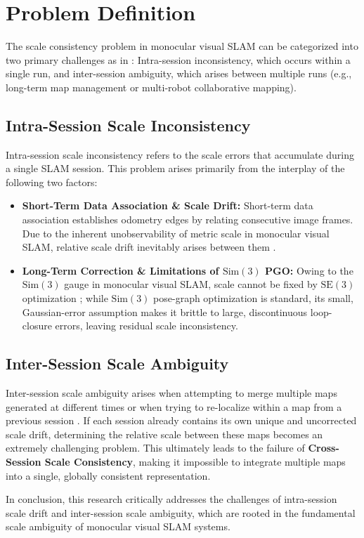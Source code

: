 % 

% 

\section{Problem Definition}
\label{sec:prob_def}

% 

% 

% 

% 

The scale consistency problem in monocular visual \ac{SLAM} can be categorized into two primary challenges as in : Intra-session inconsistency, which occurs within a single run, and inter-session ambiguity, which arises between multiple runs (e.g., long-term map management or multi-robot collaborative mapping). 

\subsection{Intra-Session Scale Inconsistency}
Intra-session scale inconsistency refers to the scale errors that accumulate during a single \ac{SLAM} session. This problem arises primarily from the interplay of the following two factors:

\begin{itemize}    
    \item \textbf{Short-Term Data Association \& Scale Drift:} 
     Short-term data association establishes odometry edges by relating consecutive image frames. Due to the inherent unobservability of metric scale in monocular visual SLAM, relative scale drift inevitably arises between them \cite{hartley2003multiple}.

    \item \textbf{Long-Term Correction \& Limitations of $\text{Sim}(3)$ \ac{PGO}:} 
    Owing to the $\text{Sim}(3)$ gauge in monocular visual SLAM, scale cannot be fixed by $\text{SE}(3)$ optimization \cite{strasdat2010scale}; while $\text{Sim}(3)$ pose-graph optimization is standard, its small, Gaussian-error assumption makes it brittle to large, discontinuous loop-closure errors, leaving residual scale inconsistency.
    
\end{itemize}

% 
\subsection{Inter-Session Scale Ambiguity}
\label{sec:intersessionscale}
Inter-session scale ambiguity arises when attempting to merge multiple maps generated at different times or when trying to re-localize within a map from a previous session \cite{kim2010multiple}. If each session already contains its own unique and uncorrected scale drift, determining the relative scale between these maps becomes an extremely challenging problem. This ultimately leads to the failure of \textbf{Cross-Session Scale Consistency}, making it impossible to integrate multiple maps into a single, globally consistent representation.


% 

% 

% 

% 

In conclusion, this research critically addresses the challenges of intra-session scale drift and inter-session scale ambiguity, which are rooted in the fundamental scale ambiguity of monocular visual SLAM systems.
